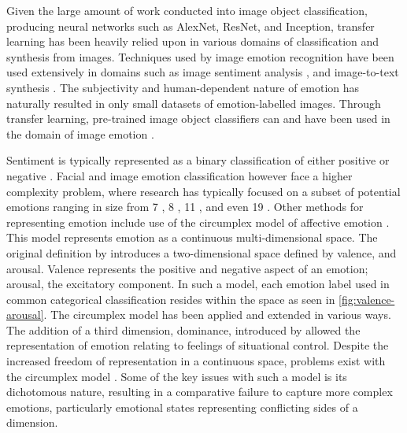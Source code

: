 \documentclass{article}
\begin{document}
Given the large amount of work conducted into image object classification, producing neural networks such as AlexNet, ResNet, and Inception, transfer learning has been heavily relied upon in various domains of classification and synthesis from images.
Techniques used by image emotion recognition have been used extensively in domains such as image sentiment analysis \citep{you2015robust}, and image-to-text synthesis \citep{vinyals2015show}.
The subjectivity and human-dependent nature of emotion has naturally resulted in only small datasets of emotion-labelled images.
Through transfer learning, pre-trained image object classifiers can and have been used in the domain of image emotion \citep{kim2018building, wangarttalk}.

Sentiment is typically represented as a binary classification of either positive or negative \citep{yang2018visual, chen2014deepsentibank}.
Facial and image emotion classification however face a higher complexity problem, where research has typically focused on a subset of potential emotions ranging in size from 7 \citep{ali2017emotional}, 8 \citep{machajdik2010affective}, 11 \citep{wangarttalk}, and even 19 \citep{mohammad2018wikiart}.
Other methods for representing emotion include use of the circumplex model of affective emotion \citep{russell1980circumplex, bradley1994measuring}.
This model represents emotion as a continuous multi-dimensional space.
The original definition by \citet{russell1980circumplex} introduces a two-dimensional space defined by valence, and arousal.
Valence represents the positive and negative aspect of an emotion; arousal, the excitatory component.
In such a model, each emotion label used in common categorical classification resides within the space as seen in \ref{fig:valence-arousal}.
The circumplex model has been applied and extended in various ways.
The addition of a third dimension, dominance, introduced by \citet{bradley1994measuring} allowed the representation of emotion relating to feelings of situational control.
Despite the increased freedom of representation in a continuous space, problems exist with the circumplex model \citep{larsen1992promises}.
Some of the key issues with such a model is its dichotomous nature, resulting in a comparative failure to capture more complex emotions, particularly emotional states representing conflicting sides of a dimension.
\end{document}
